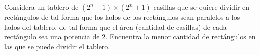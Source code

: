 Considera un tablero de $(2^n − 1) \times (2^n + 1)$ casillas que se quiere dividir en rectángulos
de tal forma que los lados de los rectángulos sean paralelos a los lados del tablero, de
tal forma que el área (cantidad de casillas) de cada rectángulo sea una potencia de $2$.
Encuentra la menor cantidad de rectángulos en las que se puede dividir el tablero.